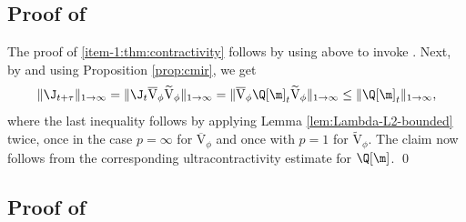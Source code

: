 \subsection{Proof of }

The proof of \eqref{item-1:thm:contractivity} follows by using  above to invoke \cite[Th.\,8]{Patie-Miclo}. Next, by  and using Proposition \ref{prop:cmir}, we get
\begin{equation*}
\|\J_{t+\tau}\|_{1\to\infty} = \|\J_t \overline{\mathrm{V}}_\phi \widetilde{\mathrm{V}}_\phi\|_{1\to\infty} = \|\overline{\mathrm{V}}_\phi \Q[\m]_t \widetilde{\mathrm{V}}_\phi\|_{1\to\infty} \leq \|\Q[\m]_t\|_{1\to\infty},
\end{equation*}
where the last inequality follows by applying Lemma \ref{lem:Lambda-L2-bounded} twice, once in the case \hbox{$p=\infty$} for $\overline{\mathrm{V}}_\phi$ and once with $p=1$ for $\widetilde{\mathrm{V}}_\phi$. The claim now follows from the corresponding ultracontractivity estimate for $\Q[\m]$. \qed

\subsection{Proof of }

